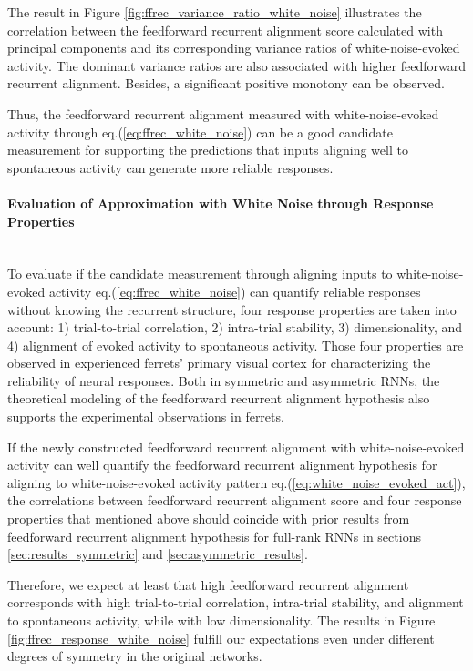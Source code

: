 \documentclass[11pt]{article}
\begin{document}
	The result in Figure \ref{fig:ffrec_variance_ratio_white_noise} illustrates the correlation between the feedforward recurrent alignment score calculated with principal components and its corresponding variance ratios of white-noise-evoked activity. The dominant variance ratios are also associated with higher feedforward recurrent alignment. Besides, a significant positive monotony can be observed.
	
	Thus, the feedforward recurrent alignment measured with white-noise-evoked activity through eq.(\ref{eq:ffrec_white_noise}) can be a good candidate measurement for supporting the predictions that inputs aligning well to spontaneous activity can generate more reliable responses. 

	\paragraph{Evaluation of Approximation with White Noise through Response Properties}\mbox{}\\
	\newline
	To evaluate if the candidate measurement through aligning inputs to white-noise-evoked activity eq.(\ref{eq:ffrec_white_noise}) can quantify reliable responses without knowing the recurrent structure, four response properties are taken into account: 1) trial-to-trial correlation, 2) intra-trial stability, 3) dimensionality, and 4) alignment of evoked activity to spontaneous activity. Those four properties are observed in experienced ferrets' primary visual cortex \cite{tragenap2023nature} for characterizing the reliability of neural responses. Both in symmetric and asymmetric RNNs, the theoretical modeling of the feedforward recurrent alignment hypothesis also supports the experimental observations in ferrets. 
	
	If the newly constructed feedforward recurrent alignment with white-noise-evoked activity can well quantify the feedforward recurrent alignment hypothesis for aligning to white-noise-evoked activity pattern eq.(\ref{eq:white_noise_evoked_act}), the correlations between feedforward recurrent alignment score and four response properties that mentioned above should coincide with prior results from feedforward recurrent alignment hypothesis for full-rank RNNs in sections \ref{sec:results_symmetric} and \ref{sec:asymmetric_results}. 
	
	Therefore, we expect at least that high feedforward recurrent alignment corresponds with high trial-to-trial correlation, intra-trial stability, and alignment to spontaneous activity, while with low dimensionality. The results in Figure \ref{fig:ffrec_response_white_noise} fulfill our expectations even under different degrees of symmetry in the original networks. 
	
\end{document}
